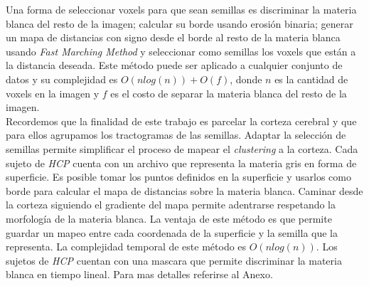 Una forma de seleccionar voxels para que sean semillas es discriminar la materia
blanca del resto de la imagen; calcular su borde usando erosi\'on binaria; generar
un mapa de distancias con signo desde el borde al resto de la materia blanca usando 
\textit{Fast Marching Method} y seleccionar como semillas los voxels que est\'an
a la distancia deseada. Este m\'etodo puede ser aplicado a cualquier conjunto
de datos y su complejidad es $O(n log(n)) + O(f)$, donde $n$ es la cantidad 
de voxels en la imagen y $f$ es el costo de separar la materia blanca del resto
de la imagen.\\

Recordemos que la finalidad de este trabajo es parcelar la corteza cerebral y 
que para ellos agrupamos los tractogramas de las semillas. Adaptar la selecci\'on
de semillas permite simplificar el proceso de mapear el \textit{clustering} a la 
corteza. Cada sujeto de \textit{HCP} cuenta con un archivo que representa la 
materia gris en forma de superficie. Es posible tomar los puntos definidos en la
superficie y usarlos como borde para calcular el mapa de distancias sobre la 
materia blanca. Caminar desde la corteza siguiendo el gradiente del mapa permite
adentrarse respetando la morfolog\'ia de la materia blanca. La ventaja de este
m\'etodo es que permite guardar un mapeo entre cada coordenada de la superficie y
la semilla que la representa. La complejidad temporal de este m\'etodo es 
$O(n log(n))$. Los sujetos de \textit{HCP} cuentan con una mascara que permite 
discriminar la materia blanca en tiempo lineal. Para mas detalles referirse al Anexo. \\

